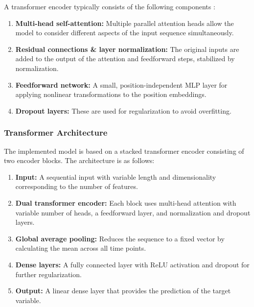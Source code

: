 A transformer encoder typically consists of the following components \cite{cnn-attention}:

\begin{enumerate}
    \item \textbf{Multi-head self-attention:} Multiple parallel attention heads allow the model to consider different aspects of the input sequence simultaneously.

    \item \textbf{Residual connections \& layer normalization:} The original inputs are added to the output of the attention and feedforward steps, stabilized by normalization.

    \item \textbf{Feedforward network:} A small, position-independent MLP layer for applying nonlinear transformations to the position embeddings.

    \item \textbf{Dropout layers:} These are used for regularization to avoid overfitting.
\end{enumerate}

\subsubsection{Transformer Architecture}

The implemented model is based on a stacked transformer encoder consisting of two encoder blocks.
The architecture is as follows:

\begin{enumerate}
    \item \textbf{Input:} A sequential input with variable length and dimensionality corresponding to the number of features.

    \item \textbf{Dual transformer encoder:} Each block uses multi-head attention with variable number of heads, a feedforward layer, and normalization and dropout layers.

    \item \textbf{Global average pooling:} Reduces the sequence to a fixed vector by calculating the mean across all time points.

    \item \textbf{Dense layers:} A fully connected layer with ReLU activation and dropout for further regularization.

    \item \textbf{Output:} A linear dense layer that provides the prediction of the target variable.
\end{enumerate}

